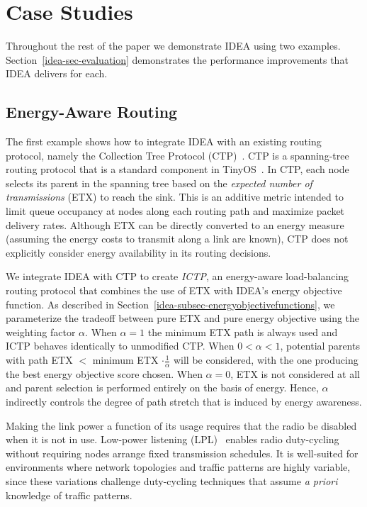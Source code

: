\section{Case Studies}
\label{idea-sec-casestudies}

Throughout the rest of the paper we demonstrate IDEA using two examples.
Section~\ref{idea-sec-evaluation} demonstrates the performance improvements
that IDEA delivers for each.

\subsection{Energy-Aware Routing}

The first example shows how to integrate IDEA with an existing routing
protocol, namely the Collection Tree Protocol (CTP)~\cite{ctp-sensys09}. CTP
is a spanning-tree routing protocol that is a standard component in
TinyOS~\cite{tinyos-asplos00}. In CTP, each node selects its parent in the
spanning tree based on the \textit{expected number of transmissions} (ETX) to
reach the sink. This is an additive metric intended to limit queue occupancy
at nodes along each routing path and maximize packet delivery rates. Although
ETX can be directly converted to an energy measure (assuming the energy costs
to transmit along a link are known), CTP does not explicitly consider energy
availability in its routing decisions.

We integrate IDEA with CTP to create \textit{ICTP}, an energy-aware
load-balancing routing protocol that combines the use of ETX with IDEA's
energy objective function. As described in
Section~\ref{idea-subsec-energyobjectivefunctions}, we parameterize the
tradeoff between pure ETX and pure energy objective using the weighting
factor $\alpha$. When $\alpha = 1$ the minimum ETX path is always used and
ICTP behaves identically to unmodified CTP. When $0 < \alpha < 1$, potential
parents with path ETX $<$ minimum ETX $\cdot \frac{1}{\alpha}$ will be
considered, with the one producing the best energy objective score chosen.
When $\alpha = 0$, ETX is not considered at all and parent selection is
performed entirely on the basis of energy. Hence, $\alpha$ indirectly
controls the degree of path stretch that is induced by energy awareness. 

Making the link power a function of its usage requires that the radio be
disabled when it is not in use. Low-power listening (LPL)~\cite{tinyos-lpl}
enables radio duty-cycling without requiring nodes arrange fixed transmission
schedules. It is well-suited for environments where network topologies and
traffic patterns are highly variable, since these variations challenge
duty-cycling techniques that assume \textit{a priori} knowledge of traffic
patterns.

